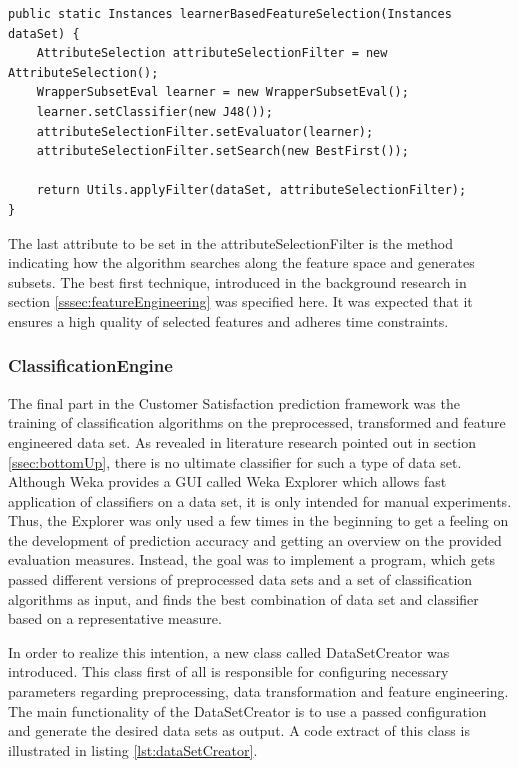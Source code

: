 \begin{lstlisting}[caption={AttributeSelectionStrategy}, label={lst:wrapperBasedFs}]
public static Instances learnerBasedFeatureSelection(Instances dataSet) {
	AttributeSelection attributeSelectionFilter = new AttributeSelection();
	WrapperSubsetEval learner = new WrapperSubsetEval();
	learner.setClassifier(new J48());
	attributeSelectionFilter.setEvaluator(learner);
	attributeSelectionFilter.setSearch(new BestFirst());
	
	return Utils.applyFilter(dataSet, attributeSelectionFilter);
}
\end{lstlisting}

The last attribute to be set in the attributeSelectionFilter is the method indicating how the algorithm searches along the feature space and generates subsets. The best first technique, introduced in the background research in section \ref{sssec:featureEngineering} was specified here. It was expected that it ensures a high quality of selected features and adheres time constraints. 

\subsubsection{ClassificationEngine}
The final part in the Customer Satisfaction prediction framework was the training of classification algorithms on the preprocessed, transformed and feature engineered data set. As revealed in literature research pointed out in section \ref{ssec:bottomUp}, there is no ultimate classifier for such a type of data set. Although Weka provides a GUI called Weka Explorer which allows fast application of classifiers on a data set, it is only intended for manual experiments. Thus, the Explorer was only used a few times in the beginning to get a feeling on the development of prediction accuracy and getting an overview on the provided evaluation measures. Instead, the goal was to implement a program, which gets passed different versions of preprocessed data sets and a set of classification algorithms as input, and finds the best combination of data set and classifier based on a representative measure. 

In order to realize this intention, a new class called DataSetCreator was introduced. This class first of all is responsible for configuring necessary parameters regarding preprocessing, data transformation and feature engineering. The main functionality of the DataSetCreator is to use a passed configuration and generate the desired data sets as output. A code extract of this class is illustrated in listing \ref{lst:dataSetCreator}. 

